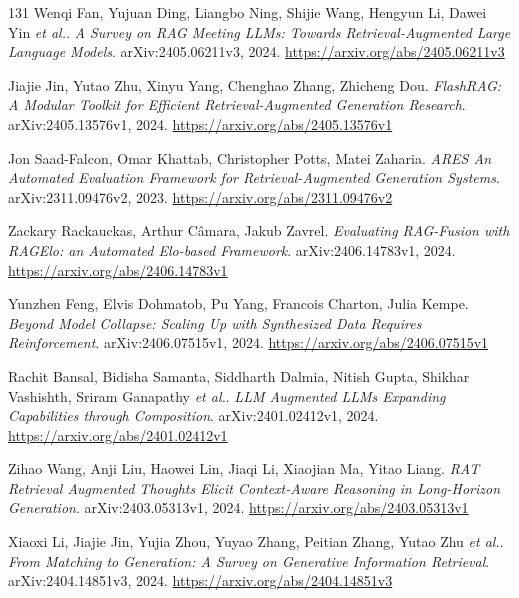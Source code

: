 \documentclass[11pt,a4paper]{article}
\begin{document}
\begin{thebibliography}{131}
Wenqi Fan, Yujuan Ding, Liangbo Ning, Shijie Wang, Hengyun Li, Dawei Yin \emph{et al.}.
\newblock \emph{A Survey on RAG Meeting LLMs: Towards Retrieval-Augmented Large Language Models}.
\newblock arXiv:2405.06211v3, 2024.
\newblock \url{https://arxiv.org/abs/2405.06211v3}

Jiajie Jin, Yutao Zhu, Xinyu Yang, Chenghao Zhang, Zhicheng Dou.
\newblock \emph{FlashRAG: A Modular Toolkit for Efficient Retrieval-Augmented Generation Research}.
\newblock arXiv:2405.13576v1, 2024.
\newblock \url{https://arxiv.org/abs/2405.13576v1}

Jon Saad-Falcon, Omar Khattab, Christopher Potts, Matei Zaharia.
\newblock \emph{ARES An Automated Evaluation Framework for Retrieval-Augmented Generation Systems}.
\newblock arXiv:2311.09476v2, 2023.
\newblock \url{https://arxiv.org/abs/2311.09476v2}

Zackary Rackauckas, Arthur C\^{a}mara, Jakub Zavrel.
\newblock \emph{Evaluating RAG-Fusion with RAGElo: an Automated Elo-based Framework}.
\newblock arXiv:2406.14783v1, 2024.
\newblock \url{https://arxiv.org/abs/2406.14783v1}

Yunzhen Feng, Elvis Dohmatob, Pu Yang, Francois Charton, Julia Kempe.
\newblock \emph{Beyond Model Collapse: Scaling Up with Synthesized Data Requires Reinforcement}.
\newblock arXiv:2406.07515v1, 2024.
\newblock \url{https://arxiv.org/abs/2406.07515v1}

Rachit Bansal, Bidisha Samanta, Siddharth Dalmia, Nitish Gupta, Shikhar Vashishth, Sriram Ganapathy \emph{et al.}.
\newblock \emph{LLM Augmented LLMs Expanding Capabilities through Composition}.
\newblock arXiv:2401.02412v1, 2024.
\newblock \url{https://arxiv.org/abs/2401.02412v1}

Zihao Wang, Anji Liu, Haowei Lin, Jiaqi Li, Xiaojian Ma, Yitao Liang.
\newblock \emph{RAT Retrieval Augmented Thoughts Elicit Context-Aware Reasoning in Long-Horizon Generation}.
\newblock arXiv:2403.05313v1, 2024.
\newblock \url{https://arxiv.org/abs/2403.05313v1}

Xiaoxi Li, Jiajie Jin, Yujia Zhou, Yuyao Zhang, Peitian Zhang, Yutao Zhu \emph{et al.}.
\newblock \emph{From Matching to Generation: A Survey on Generative Information Retrieval}.
\newblock arXiv:2404.14851v3, 2024.
\newblock \url{https://arxiv.org/abs/2404.14851v3}


\end{thebibliography}
\end{document}
